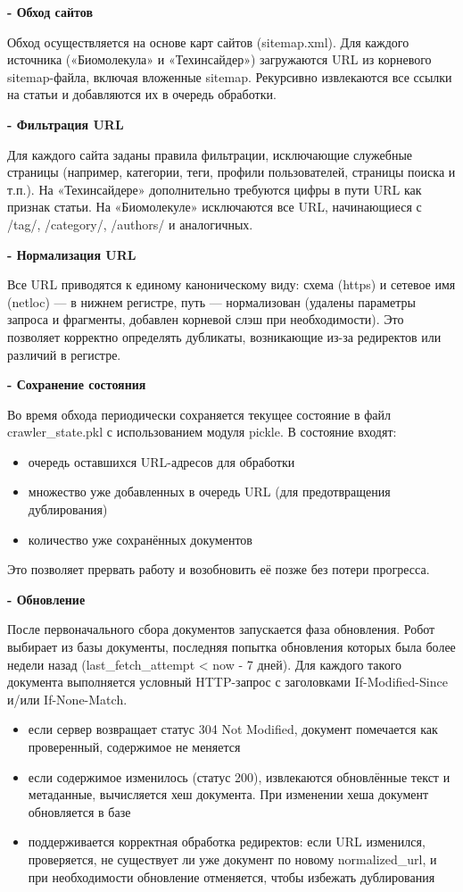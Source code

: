 \documentclass[pdf, unicode, 12pt, a4paper, oneside, fleqn]{article}
\begin{document}
\textbf{- Обход сайтов}

Обход осуществляется на основе карт сайтов (sitemap.xml). Для 
каждого источника («Биомолекула» и «Техинсайдер») загружаются URL из 
корневого sitemap-файла, включая вложенные sitemap. Рекурсивно 
извлекаются все ссылки на статьи и добавляются их в очередь обработки. 

\textbf{- Фильтрация URL}

Для каждого сайта заданы правила фильтрации, исключающие 
служебные страницы (например, категории, теги, профили пользователей, 
страницы поиска и т.п.). На «Техинсайдере» дополнительно требуются 
цифры в пути URL как признак статьи. На «Биомолекуле» исключаются все 
URL, начинающиеся с /tag/, /category/, /authors/ и аналогичных. 

\textbf{- Нормализация URL}

Все URL приводятся к единому каноническому виду: схема (https) и 
сетевое имя (netloc) — в нижнем регистре, путь — нормализован (удалены 
параметры запроса и фрагменты, добавлен корневой слэш при 
необходимости). Это позволяет корректно определять дубликаты, 
возникающие из-за редиректов или различий в регистре. 

\textbf{- Сохранение состояния}

Во время обхода периодически сохраняется текущее состояние в 
файл crawler\_state.pkl с использованием модуля pickle. В состояние входят:
\begin{itemize}
    \item очередь оставшихся URL-адресов для обработки
    \item множество уже добавленных в очередь URL (для предотвращения 
дублирования)
    \item количество уже сохранённых документов
\end{itemize}
Это позволяет прервать работу и возобновить её позже без потери прогресса. 

\textbf{- Обновление}

После первоначального сбора документов запускается фаза 
обновления. Робот выбирает из базы документы, последняя попытка 
обновления которых была более недели назад (last\_fetch\_attempt < now - 7 дней). Для каждого такого документа выполняется условный HTTP-запрос с заголовками If-Modified-Since и/или If-None-Match. 
\begin{itemize}
    \item если сервер возвращает статус 304 Not Modified, документ помечается как проверенный, содержимое не меняется
    \item если содержимое изменилось (статус 200), извлекаются обновлённые текст и метаданные, вычисляется хеш документа. При изменении хеша документ обновляется в базе
    \item поддерживается корректная обработка редиректов: если URL изменился, проверяется, не существует ли уже документ по новому normalized\_url, и при необходимости обновление отменяется, чтобы избежать дублирования
\end{itemize}
\end{document}
